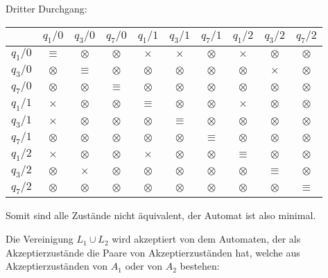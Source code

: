 \begin{loesung}
\begin{teilaufgaben}
\begin{center}
\end{center}
Dritter Durchgang:
\begin{center}
\begin{tabular}{|c|ccccccccc|}
\hline
         &$q_1/0$  &$q_3/0$  &$q_7/0$  &$q_1/1$  &$q_3/1$  &$q_7/1$  &$q_1/2$  &$q_3/2$  &$q_7/2$  \\
\hline
$q_1/0$  &$\equiv$ &$\otimes$&$\otimes$&$\times$ &$\times$ &$\otimes$&$\times$ &$\otimes$&$\otimes$\\
$q_3/0$  &$\otimes$&$\equiv$ &$\otimes$&$\otimes$&$\otimes$&$\otimes$&$\otimes$&$\times$ &$\otimes$\\
$q_7/0$  &$\otimes$&$\otimes$&$\equiv$ &$\otimes$&$\otimes$&$\otimes$&$\otimes$&$\otimes$&$\otimes$\\
$q_1/1$  &$\times$ &$\otimes$&$\otimes$&$\equiv$ &$\otimes$&$\otimes$&$\times$ &$\otimes$&$\otimes$\\
$q_3/1$  &$\times$ &$\otimes$&$\otimes$&$\otimes$&$\equiv$ &$\otimes$&$\otimes$&$\otimes$&$\otimes$\\
$q_7/1$  &$\otimes$&$\otimes$&$\otimes$&$\otimes$&$\otimes$&$\equiv$ &$\otimes$&$\otimes$&$\otimes$\\
$q_1/2$  &$\times$ &$\otimes$&$\otimes$&$\times$ &$\otimes$&$\otimes$&$\equiv$ &$\otimes$&$\otimes$\\
$q_3/2$  &$\otimes$&$\times$ &$\otimes$&$\otimes$&$\otimes$&$\otimes$&$\otimes$&$\equiv$ &$\otimes$\\
$q_7/2$  &$\otimes$&$\otimes$&$\otimes$&$\otimes$&$\otimes$&$\otimes$&$\otimes$&$\otimes$&$\equiv$ \\
\hline
\end{tabular}
\end{center}
Somit sind alle Zustände nicht äquivalent, der Automat ist also minimal.
\item
Die Vereinigung $L_1\cup L_2$ wird akzeptiert von dem Automaten,
der als Akzeptierzustände die Paare von Akzeptierzuständen hat, welche
aus Akzeptierzuständen von $A_1$ oder von $A_2$ bestehen:
\begin{center}
\end{center}
\end{teilaufgaben}
\end{loesung}
